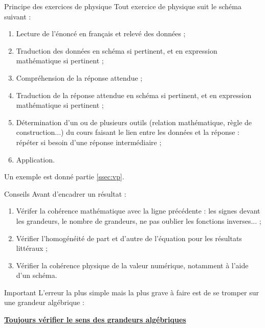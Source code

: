 \documentclass[10pt,notitlepage]{book}
\begin{document}
\begin{NCprop}{Principe des exercices de physique}
    Tout exercice de physique suit le schéma suivant :
    \begin{enumerate}
        \item Lecture de l'énoncé en français et relevé des données ;
        \item Traduction des données en schéma si pertinent, et en expression
            mathématique si pertinent ;
        \item Compréhension de la réponse attendue ;
        \item Traduction de la réponse attendue en schéma si pertinent, et en
            expression mathématique si pertinent ;
        \item Détermination d'un ou de plusieurs outils (relation mathématique,
            règle de construction...) du cours faisant le lien entre les données
            et la réponse : répéter si besoin d'une réponse intermédiaire ;
        \item Application.
    \end{enumerate}
    Un exemple est donné partie \ref{ssec:vp}.
\end{NCprop}


\begin{NCcoro}{Conseils}
    Avant d'encadrer un résultat :
    \begin{enumerate}
        \item Vérifer la cohérence mathématique avec la ligne précédente : les
            signes devant les grandeurs, le nombre de grandeurs, ne pas oublier
            les fonctions inverses... ;
        \item Vérifier l'homogénéité de part et d'autre de l'équation pour les
            résultats littéraux ;
        \item Vérifier la cohérence physique de la valeur numérique, notamment à
            l'aide d'un schéma.
    \end{enumerate}
\end{NCcoro}

\begin{NCimpo}{Important}
    L'erreur la plus simple mais la plus grave à faire est de se tromper sur une
    grandeur algébrique :
    \begin{center}
        \textbf{\underline{Toujours vérifier le sens des grandeurs algébriques}}
    \end{center}
\end{NCimpo}
\end{document}
